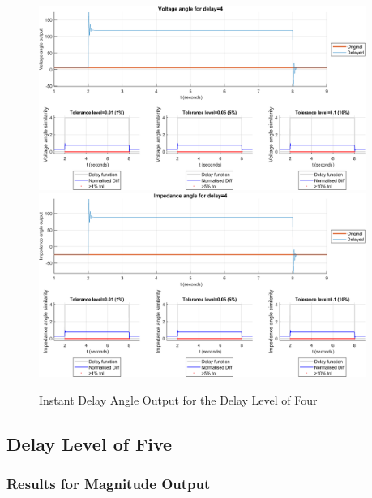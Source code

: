 \begin{figure}
    \caption{Instant Delay Angle Output for the Delay Level of Four}
    \includegraphics[width=0.95\textwidth]{PMUsim-figures/DelayOf_4/Instant_vAngle.png}    
   \includegraphics[width=0.95\textwidth]{PMUsim-figures/DelayOf_4/Instant_iAngle.png}    
    \label{fig:PMUsim_Four_Angle}
        \begin{small}
     \end{small}
\end{figure}

\newpage \subsection{Delay Level of Five}
\subsubsection{Results for Magnitude Output}

